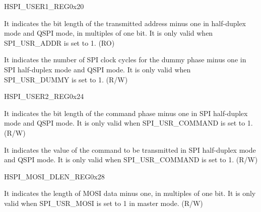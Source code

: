 \begin{register}{H}{SPI\_USER1\_REG}{0x20}\label{regdesc:SPIUSER1REG}
%
%
%
\regnewline%
\begin{regdesc}\begin{reglist}
\item [SPI\_USR\_ADDR\_BITLEN]It indicates the bit length of the transmitted address minus one in half-duplex mode and QSPI mode, in multiples of one bit. It is only valid when SPI\_USR\_ADDR is set to 1. (RO)
\item [SPI\_USR\_DUMMY\_CYCLELEN]It indicates the number of SPI clock cycles for the dummy phase minus one in SPI half-duplex mode and QSPI mode. It is only valid when SPI\_USR\_DUMMY is set to 1. (R/W)
\end{reglist}\end{regdesc}
\end{register}


\begin{register}{H}{SPI\_USER2\_REG}{0x24}\label{regdesc:SPIUSER2REG}
%
%
%
\regnewline%
\begin{regdesc}\begin{reglist}
\item [SPI\_USR\_COMMAND\_BITLEN]It indicates the bit length of the command phase minus one in SPI half-duplex mode and QSPI mode. It is only valid when SPI\_USR\_COMMAND is set to 1. (R/W)
\item [SPI\_USR\_COMMAND\_VALUE] It indicates the value of the command to be transmitted in SPI half-duplex mode and QSPI mode. It is only valid when SPI\_USR\_COMMAND is set to 1. (R/W)
\end{reglist}\end{regdesc}
\end{register}


\begin{register}{H}{SPI\_MOSI\_DLEN\_REG}{0x28}\label{regdesc:SPIMOSIDLENREG}
%
%
\regnewline%
\begin{regdesc}\begin{reglist}
\item [SPI\_USR\_MOSI\_DBITLEN]It indicates the length of MOSI data minus one, in multiples of one bit. It is only valid when SPI\_USR\_MOSI is set to 1 in master mode. (R/W)
\end{reglist}\end{regdesc}
\end{register}


